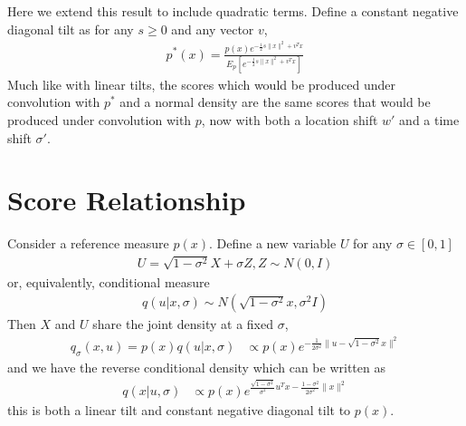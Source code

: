 \documentclass[11pt]{article}
\theoremstyle{proposition}
\theoremstyle{lemma}
\theoremstyle{corollary}
\theoremstyle{theorem}
\theoremstyle{definition}
\begin{document}
Here we extend this result to include quadratic terms. Define a constant negative diagonal tilt as for any $s \geq 0$ and any vector $v$,
\begin{align}
p^{*}(x) = \frac{p(x)e^{-\frac{1}{2}s\|x\|^{2}+v^{T}x}}{E_{p}[e^{-\frac{1}{2}s\|x\|^{2}+v^{T}x}]}\label{tilt_eqn}
\end{align} 
Much like with linear tilts, the scores which would be produced under convolution with $p^{*}$ and a normal density are the same scores that would be produced under convolution with $p$, now with both a location shift $w'$ and a time shift $\sigma'$.

\section{Score Relationship}
Consider a reference measure $p(x)$. Define a new variable $U$ for any $\sigma \in [0,1]$
\begin{align}
U = \sqrt{1-\sigma^{2}}X+\sigma Z, Z \sim N(0,I)
\end{align}
or, equivalently, conditional measure
\begin{align}
q(u|x,\sigma) \sim N(\sqrt{1-\sigma^{2}}x, \sigma^{2}I)
\end{align}
Then $X$ and $U$ share the joint density at a fixed $\sigma$,
\begin{align}
q_{\sigma}(x,u) = p(x)q(u|x,\sigma)&\propto p(x)e^{-\frac{1}{2\sigma^{2}}\|u - \sqrt{1-\sigma^{2}}x\|^{2}}
\end{align}
and we have the reverse conditional density which can be written as
\begin{align}
q(x|u,\sigma)&\propto p(x)e^{\frac{\sqrt{1-\sigma^{2}}}{\sigma^{2}}u^{T}x- \frac{1-\sigma^{2}}{2 \sigma^{2}}\|x\|^{2}}\label{rev_con_density}
\end{align}
this is both a linear tilt and constant negative diagonal tilt to $p(x)$.
\end{document}
